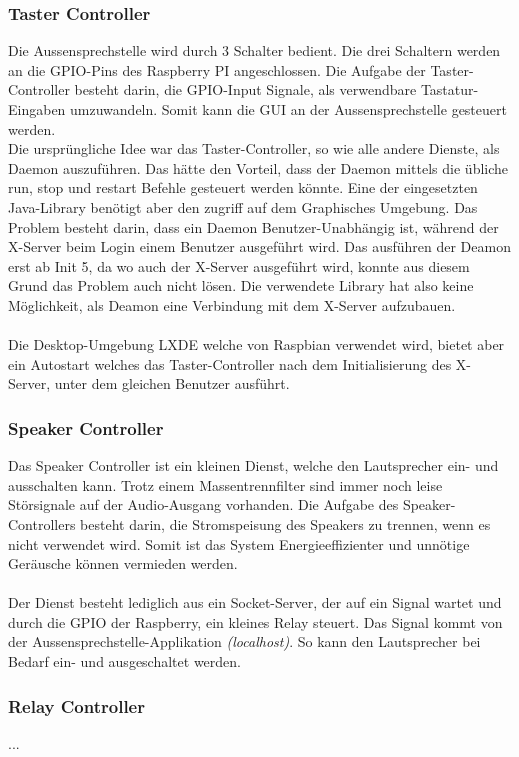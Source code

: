 \subsubsection{Taster Controller}
Die Aussensprechstelle wird durch 3 Schalter bedient. Die drei Schaltern werden an die GPIO-Pins des Raspberry PI angeschlossen. Die Aufgabe der Taster-Controller besteht darin, die GPIO-Input Signale, als verwendbare Tastatur-Eingaben umzuwandeln. Somit kann die GUI an der Aussensprechstelle gesteuert werden.
\\
Die ursprüngliche Idee war das Taster-Controller, so wie alle andere Dienste, als Daemon auszuführen. Das hätte den Vorteil, dass der Daemon mittels die übliche run, stop und restart Befehle gesteuert werden könnte. Eine der eingesetzten Java-Library benötigt aber den zugriff auf dem Graphisches Umgebung. Das Problem besteht darin, dass ein Daemon Benutzer-Unabhängig ist, während der X-Server beim Login einem Benutzer ausgeführt wird. Das ausführen der Deamon erst ab Init 5, da wo auch der X-Server ausgeführt wird, konnte aus diesem Grund das Problem auch nicht lösen.
Die verwendete Library hat also keine Möglichkeit, als Deamon eine Verbindung mit dem X-Server aufzubauen. 
\\\\
Die Desktop-Umgebung LXDE welche von Raspbian verwendet wird, bietet aber ein Autostart welches das Taster-Controller nach dem Initialisierung des X-Server, unter dem gleichen Benutzer ausführt.

\subsubsection{Speaker Controller}
Das Speaker Controller ist ein kleinen Dienst, welche den Lautsprecher ein- und ausschalten kann. Trotz einem Massentrennfilter sind immer noch leise Störsignale auf der Audio-Ausgang vorhanden. 
Die Aufgabe des Speaker-Controllers besteht darin, die Stromspeisung des Speakers zu trennen, wenn es nicht verwendet wird. Somit ist das System Energieeffizienter und unnötige Geräusche können vermieden werden.
\\
\\
Der Dienst besteht lediglich aus ein Socket-Server, der auf ein Signal wartet und durch die GPIO der Raspberry, ein kleines Relay steuert.
Das Signal kommt von der Aussensprechstelle-Applikation \textit{(localhost)}. So kann den Lautsprecher bei Bedarf ein- und ausgeschaltet werden.

\subsubsection{Relay Controller}
...
